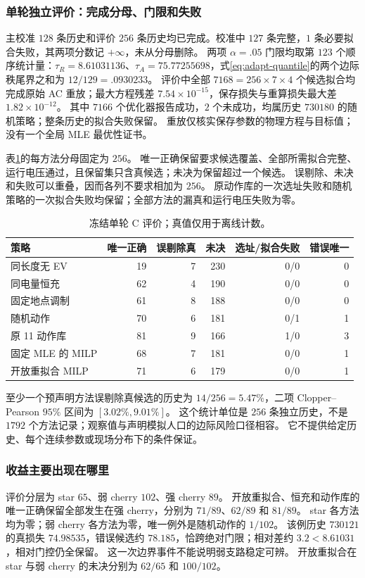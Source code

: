 \documentclass[UTF8,fontset=fandol,11pt,a4paper]{ctexart}
\begin{document}
\subsubsection{单轮独立评价：完成分母、门限和失败}
主校准 $128$ 条历史和评价 $256$ 条历史均已完成。校准中 $127$ 条完整，$1$ 条必要拟合失败，其两项分数记 $+\infty$，未从分母删除。
两项 $\alpha=.05$ 门限均取第 $123$ 个顺序统计量：$\tau_R=8.61031136$、$\tau_A=75.77255698$，式\eqref{eq:adapt-quantile}的两个边际秩尾界之和为 $12/129=.0930233$。
评价中全部 $7168=256\times7\times4$ 个候选拟合均完成原始 AC 重放；最大方程残差 $7.54\times10^{-15}$，保存损失与重算损失最大差 $1.82\times10^{-12}$。
其中 $7166$ 个优化器报告成功，$2$ 个未成功，均属历史 $730180$ 的随机策略；整条历史的拟合失败保留。
重放仅核实保存参数的物理方程与目标值；没有一个全局 MLE 最优性证书。

表\ref{tab:adapt-C-main}的每方法分母固定为 $256$。
唯一正确保留要求候选覆盖、全部所需拟合完整、运行电压通过，且保留集只含真候选；未决为保留超过一个候选。
误剔除、未决和失败可以重叠，因而各列不要求相加为 $256$。
原动作库的一次选址失败和随机策略的一次拟合失败均保留；全部方法的漏真和运行电压失败为零。
\begin{table}[htbp]
\centering\small
\caption{冻结单轮 C 评价；真值仅用于离线计数。}\label{tab:adapt-C-main}
\begin{tabular}{lrrrrr}\toprule
策略 & 唯一正确 & 误剔除真 & 未决 & 选址/拟合失败 & 错误唯一\\\midrule
同长度无 EV &19&7&230&0/0&0\\
同电量恒充 &62&4&190&0/0&0\\
固定地点调制 &61&8&188&0/0&0\\
随机动作 &70&6&181&0/1&1\\
原 11 动作库 &81&9&166&1/0&3\\
固定 MLE 的 MILP &68&7&181&0/0&1\\
开放重拟合 MILP &71&6&179&0/0&1\\\bottomrule
\end{tabular}
\end{table}

至少一个预声明方法误剔除真候选的历史为 $14/256=5.47\%$，二项 Clopper--Pearson $95\%$ 区间为 $[3.02\%,9.01\%]$。
这个统计单位是 $256$ 条独立历史，不是 $1792$ 个方法记录；观察值与声明模拟人口的边际风险口径相容。
它不提供给定历史、每个连续参数或现场分布下的条件保证。

\subsubsection{收益主要出现在哪里}
评价分层为 star $65$、弱 cherry $102$、强 cherry $89$。
开放重拟合、恒充和动作库的唯一正确保留全部发生在强 cherry，分别为 $71/89$、$62/89$ 和 $81/89$。
star 各方法均为零；弱 cherry 各方法为零，唯一例外是随机动作的 $1/102$。
该例历史 $730121$ 的真损失 $74.98535$，错误候选约 $78.185$，恰跨绝对门限；相对差约 $3.2<8.61031$，相对门控仍全保留。
这一次边界事件不能说明弱支路稳定可辨。
开放重拟合在 star 与弱 cherry 的未决分别为 $62/65$ 和 $100/102$。
\end{document}
